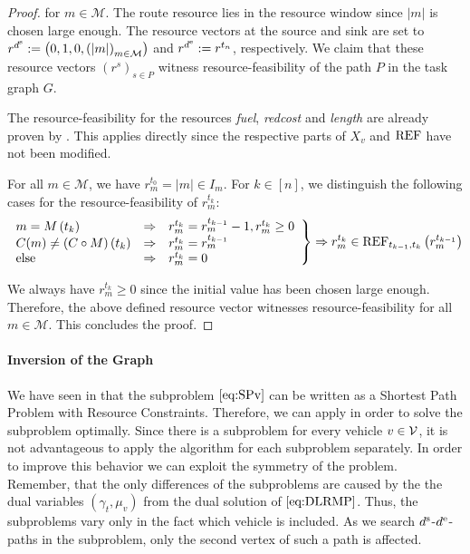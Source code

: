\begin{proof}
for $m\in\mathcal{M}$. The route resource lies in the resource window since $\vert m\vert$ is chosen large enough. The resource vectors at the source and sink are set to ${r^{d^{\operatorname{s}}} := \left(0,1,0,\left(\vert m\vert\right)_{m\in\mathcal{M}}\right)}$ and ${r^{d^{\operatorname{e}}} := r^{t_n}}$, respectively. We claim that these resource vectors $\left(r^s\right)_{s\in P}$ witness resource-feasibility of the path $P$ in the task graph $G$. 

The resource-feasibility for the resources \emph{fuel}, \emph{redcost} and \emph{length} are already proven by \cite{Kaiser}. This applies directly since the respective parts of $X_v$ and $\operatorname{REF}$ have not been modified.

For all $m\in\mathcal{M}$, we have ${r^{t_0}_m = \vert m\vert\in I_m}$. For ${k\in[n]}$, we distinguish the following cases for the resource-feasibility of $r^{t_k}_m$:
\begin{align*}
	\left. \begin{array}{lll}
		m = M\left(t_k\right) & \Rightarrow & r^{t_k}_m = r^{t_{k-1}}_m - 1, r^{t_k}_m\geq 0 \\
		C(m)\neq\left(C\circ M\right)\left(t_k\right) & \Rightarrow  & r^{t_k}_m = r^{t_{k-1}}_m \\
		\text{else} & \Rightarrow & r^{t_k}_m = 0
	\end{array} \right\} \Rightarrow r^{t_k}_m\in\operatorname{REF}_{t_{k-1},t_k}\left(r^{t_{k-1}}_m\right)
\end{align*}

We always have ${r^{t_k}_m\geq 0}$ since the initial value has been chosen large enough. Therefore, the above defined resource vector witnesses resource-feasibility for all $m\in\mathcal{M}$. This concludes the proof.

\end{proof}

\paragraph{Inversion of the Graph} \parfill

We have seen in  that the subproblem $\eqref{eq:SPv}$ can be written as a Shortest Path Problem with Resource Constraints. Therefore, we can apply  in order to solve the subproblem optimally. Since there is a subproblem for every vehicle $v\in\mathcal{V}$, it is not advantageous to apply the algorithm for each subproblem separately. In order to improve this behavior we can exploit the symmetry of the problem. Remember, that the only differences of the subproblems are caused by the the dual variables $\left(\gamma_t,\mu_v\right)$ from the dual solution of $\eqref{eq:DLRMP}$. Thus, the subproblems vary only in the fact which vehicle is included. As we search $d^{\operatorname{s}}$-$d^{\operatorname{e}}$-paths in the subproblem, only the second vertex of such a path is affected. 

